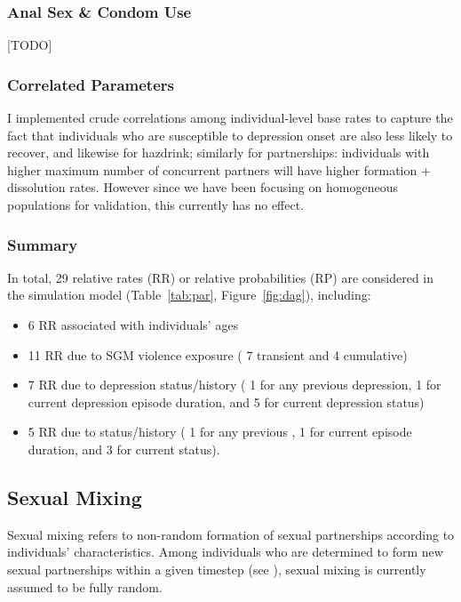 \subsubsection{Anal Sex \& Condom Use}
[TODO]
\subsubsection{Correlated Parameters}
\note{[TODO]}
     {I implemented crude correlations among individual-level base rates to capture the fact that
      individuals who are susceptible to depression onset are also less likely to recover,
      and likewise for hazdrink; similarly for partnerships:
      individuals with higher maximum number of concurrent partners
      will have higher formation + dissolution rates.
      However since we have been focusing on homogeneous populations for validation,
      this currently has no effect.}
\subsubsection{Summary}\label{mod.par.evt.sum}
In total, 29 relative rates (RR) or relative probabilities (RP) are considered
in the simulation model (Table~\ref{tab:par}, Figure~\ref{fig:dag}), including:
\begin{itemize}
  \item 6 RR associated with individuals' ages
  \item 11 RR due to SGM violence exposure (%
    7 transient and 4 cumulative)
  \item 7 RR due to depression status/history (%
    1 for any previous depression,
    1 for current depression episode duration, and
    5 for current depression status)
  \item 5 RR due to \hazdrink status/history (%
    1 for any previous \hazdrink,
    1 for current \hazdrink episode duration, and
    3 for current \hazdrink status).
\end{itemize}
\subsection{Sexual Mixing}\label{mod.par.mix}
Sexual mixing refers to non-random formation of sexual partnerships
according to individuals' characteristics.
Among individuals who are determined to form new sexual partnerships
within a given timestep (see ),
sexual mixing is currently assumed to be fully random.
